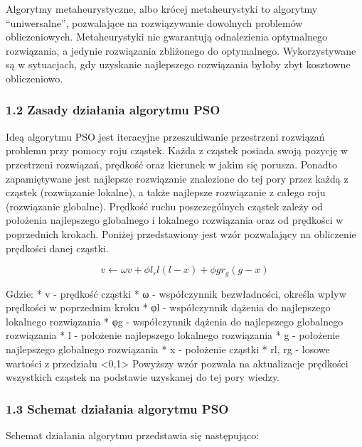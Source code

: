 \documentclass[11pt]{article}
\begin{document}
Algorytmy metaheurystyczne, albo krócej metaheurystyki to algorytmy
``uniwersalne'', pozwalające na rozwiązywanie dowolnych problemów
obliczeniowych. Metaheurystyki nie gwarantują odnalezienia optymalnego
rozwiązania, a jedynie rozwiązania zbliżonego do optymalnego.
Wykorzystywane są w sytuacjach, gdy uzyskanie najlepszego rozwiązania
byłoby zbyt kosztowne obliczeniowo.

\hypertarget{zasady-dziaux142ania-algorytmu-pso}{%
\subsubsection{1.2 Zasady działania algorytmu
PSO}\label{zasady-dziaux142ania-algorytmu-pso}}

Ideą algorytmu PSO jest iteracyjne przeszukiwanie przestrzeni rozwiązań
problemu przy pomocy roju cząstek. Każda z cząstek posiada swoją pozycję
w przestrzeni rozwiązań, prędkość oraz kierunek w jakim się porusza.
Ponadto zapamiętywane jest najlepsze rozwiązanie znalezione do tej pory
przez każdą z cząstek (rozwiązanie lokalne), a także najlepsze
rozwiązanie z całego roju (rozwiązanie globalne). Prędkość ruchu
poszczególnych cząstek zależy od położenia najlepszego globalnego i
lokalnego rozwiązania oraz od prędkości w poprzednich krokach. Poniżej
przedstawiony jest wzór pozwalający na obliczenie prędkości danej
cząstki.

\[
v \leftarrow \omega v + \phi l_rl(l-x) + \phi gr_g(g-x)
\]

Gdzie: * v - prędkość cząstki * ω - współczynnik bezwładności, określa
wpływ prędkości w poprzednim kroku * φl - współczynnik dążenia do
najlepszego lokalnego rozwiązania * φg - współczynnik dążenia do
najlepszego globalnego rozwiązania * l - położenie najlepszego lokalnego
rozwiązania * g - położenie najlepszego globalnego rozwiązania * x -
położenie cząstki * rl, rg - losowe wartości z przedziału
\textless0,1\textgreater{} Powyższy wzór pozwala na aktualizacje
prędkości wszystkich cząstek na podstawie uzyskanej do tej pory wiedzy.

\hypertarget{schemat-dziaux142ania-algorytmu-pso}{%
\subsubsection{1.3 Schemat działania algorytmu
PSO}\label{schemat-dziaux142ania-algorytmu-pso}}

Schemat działania algorytmu przedstawia się następująco:
\end{document}
